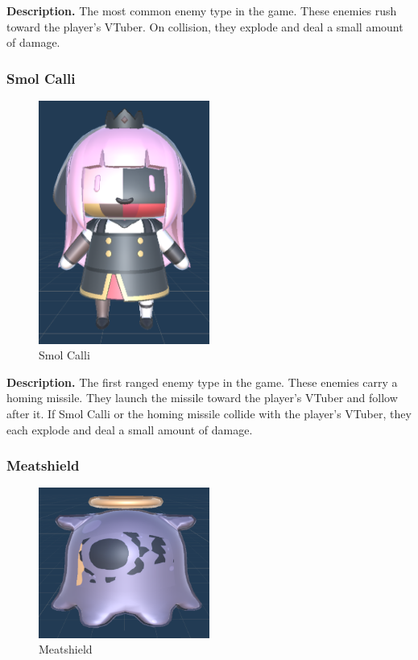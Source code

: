 \documentclass[10pt, a4paper]{article}
\begin{document}
	\textbf{Description.} The most common enemy type in the game. These enemies rush toward the player's VTuber. On collision, they explode and deal a small amount of damage.

	\goodbreak

	\subsubsection{Smol Calli}

	\begin{figure}[H]
		\centering
		\includegraphics[width=0.5\textwidth]{images/smol_calli1.png}
		\caption{Smol Calli}
		\label{fig:smolcalli}
	\end{figure}

	\textbf{Description.} The first ranged enemy type in the game. These enemies carry a homing missile. They launch the missile toward the player's VTuber and follow after it. If Smol Calli or the homing missile collide with the player's VTuber, they each explode and deal a small amount of damage.

	\subsubsection{Meatshield}

	\begin{figure}[H]
		\centering
		\includegraphics[width=0.5\textwidth]{images/takodachi1.png}
		\caption{Meatshield}
		\label{fig:meatshield}
	\end{figure}
\end{document}
